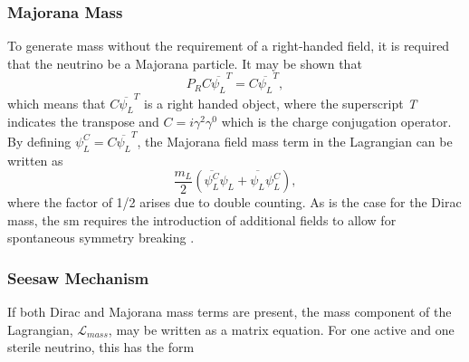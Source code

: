 \subsubsection{Majorana Mass}
To generate mass without the requirement of a right-handed field, it is required that the neutrino be a Majorana particle. It may be shown that 
\begin{equation}
    P_R C\overline{\psi_L}^T = C\overline{\psi_L}^T,
\end{equation}
which means that $C\overline{\psi_L}^T$ is a right handed object, where the superscript \textit{T} indicates the transpose and $C = i \gamma^2 \gamma^0$ which is the charge conjugation operator. By defining $\psi_L^C = C\overline{\psi_L}^T$, the Majorana field mass term in the Lagrangian can be written as
\begin{equation}\label{eqn:Majorana mass term}
    \frac{m_L}{2}(\overline{\psi_L^C}\psi_L + \overline{\psi_L^{\phantom{C}}}\psi_L^C), 
\end{equation}
where the factor of 1/2 arises due to double counting. As is the case for the Dirac mass, the \gls{sm} requires the introduction of additional fields to allow for spontaneous symmetry breaking \cite{Fundamentals_of_Neutrino_Physics_and_Astrophysics}. 

\subsubsection{Seesaw Mechanism}\label{sec:seesaw_mechanism}
If both Dirac and Majorana mass terms are present, the mass component of the Lagrangian, $\mathcal{L}_{mass}$, may be written as a matrix equation. For one active and one sterile neutrino, this has the form


